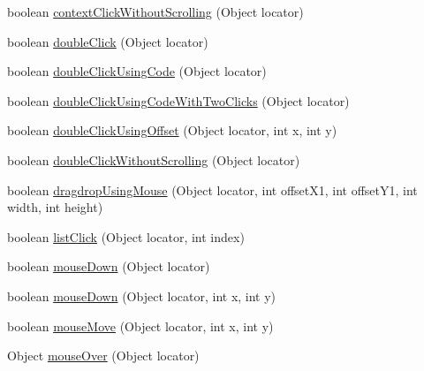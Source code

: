 \begin{DoxyCompactItemize}
boolean \hyperlink{classcom_1_1zeuslearning_1_1automation_1_1selenium_1_1interactions_1_1Mouse_a4da809ce4b2d0d9293b23bda7c3b98b0}{context\+Click\+Without\+Scrolling} (Object locator)
\item 
boolean \hyperlink{classcom_1_1zeuslearning_1_1automation_1_1selenium_1_1interactions_1_1Mouse_a52db5f47eaacbf45fefed4f20be7fbf0}{double\+Click} (Object locator)
\item 
boolean \hyperlink{classcom_1_1zeuslearning_1_1automation_1_1selenium_1_1interactions_1_1Mouse_a4d718e201b6eb171a4016ea46e5f538b}{double\+Click\+Using\+Code} (Object locator)
\item 
boolean \hyperlink{classcom_1_1zeuslearning_1_1automation_1_1selenium_1_1interactions_1_1Mouse_a083f651ca67fec159c6992f44019164b}{double\+Click\+Using\+Code\+With\+Two\+Clicks} (Object locator)
\item 
boolean \hyperlink{classcom_1_1zeuslearning_1_1automation_1_1selenium_1_1interactions_1_1Mouse_a43e7a98c6045351ffbc6eeb5406c8794}{double\+Click\+Using\+Offset} (Object locator, int x, int y)
\item 
boolean \hyperlink{classcom_1_1zeuslearning_1_1automation_1_1selenium_1_1interactions_1_1Mouse_aaab22a7e838b862a7e7e02879d5622d2}{double\+Click\+Without\+Scrolling} (Object locator)
\item 
boolean \hyperlink{classcom_1_1zeuslearning_1_1automation_1_1selenium_1_1interactions_1_1Mouse_a82e9cde3b736af28bad478dbf2d69889}{dragdrop\+Using\+Mouse} (Object locator, int offset\+X1, int offset\+Y1, int width, int height)
\item 
boolean \hyperlink{classcom_1_1zeuslearning_1_1automation_1_1selenium_1_1interactions_1_1Mouse_ae7d7e20e0aa4c531d441da986d4fa3f0}{list\+Click} (Object locator, int index)
\item 
boolean \hyperlink{classcom_1_1zeuslearning_1_1automation_1_1selenium_1_1interactions_1_1Mouse_a208023bff8f5799e5e61dfaa190d5feb}{mouse\+Down} (Object locator)
\item 
boolean \hyperlink{classcom_1_1zeuslearning_1_1automation_1_1selenium_1_1interactions_1_1Mouse_a1821b5da6deb7f0edd6cc7b950ef2ffe}{mouse\+Down} (Object locator, int x, int y)
\item 
boolean \hyperlink{classcom_1_1zeuslearning_1_1automation_1_1selenium_1_1interactions_1_1Mouse_a0d8034eab9e3c8b27c38d862f75219cc}{mouse\+Move} (Object locator, int x, int y)
\item 
Object \hyperlink{classcom_1_1zeuslearning_1_1automation_1_1selenium_1_1interactions_1_1Mouse_ae3becce24a081e1ad2151b383c2d9404}{mouse\+Over} (Object locator)

\end{DoxyCompactItemize}
